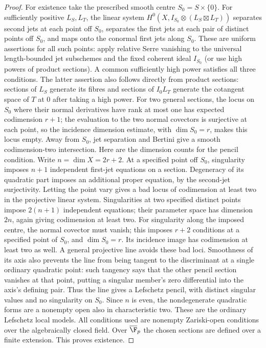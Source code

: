 \documentclass[11pt]{article}
\theoremstyle{remark}\newtheorem{remark}[theorem]{Remark}
\begin{document}
\begin{proof}
For existence take the prescribed smooth centre $S_0=S\times\{0\}$.
For sufficiently positive $L_S,L_T$, the linear system
$H^0(X,I_{S_0}\otimes(L_S\boxtimes L_T))$ separates second jets
at each point off $S_0$, separates the first jets at each pair of
distinct points off $S_0$, and maps onto the conormal first jets
along $S_0$. These are uniform assertions for all such points:
apply relative Serre vanishing to the universal length-bounded
jet subschemes and the fixed coherent ideal $I_{S_0}$ (or use
high powers of product sections). A common sufficiently high
power satisfies all three conditions.
The latter assertion also follows directly from product sections:
sections of $L_S$ generate its fibres and sections of $I_0L_T$
generate the cotangent space of $T$ at $0$ after taking a high power.
For two general sections, the locus on $S_0$ where their normal
derivatives have rank at most one has expected codimension $r+1$;
the evaluation to the two normal covectors is surjective at each
point, so the incidence dimension estimate, with $\dim S_0=r$,
makes this locus empty. Away from $S_0$, jet separation and
Bertini give a smooth codimension-two intersection. Here are the
dimension counts for the pencil condition. Write $n=\dim X=2r+2$.
At a specified point off $S_0$, singularity imposes $n+1$
independent first-jet equations on a section. Degeneracy of its
quadratic part imposes an additional proper equation, by the
second-jet surjectivity. Letting the point vary gives a bad locus
of codimension at least two in the projective linear system.
Singularities at two specified distinct points impose $2(n+1)$
independent equations; their parameter space has dimension $2n$,
again giving codimension at least two. For singularity along the
imposed centre, the normal covector must vanish; this imposes
$r+2$ conditions at a specified point of $S_0$, and $\dim S_0=r$.
Its incidence image has codimension at least two as well. A general
projective line avoids these bad loci. Smoothness of its axis
also prevents the line from being tangent to the discriminant at
a single ordinary quadratic point: such tangency says that the
other pencil section vanishes at that point, putting a singular
member's zero differential into the axis's defining pair.
Thus the line gives a Lefschetz pencil, with distinct singular
values and no singularity on $S_0$. Since $n$ is even, the
nondegenerate quadratic forms are a nonempty open also in
characteristic two. These are the ordinary Lefschetz local models.
All conditions used are nonempty Zariski-open conditions over the
algebraically closed field. Over $\overline{\F}_p$ the chosen
sections are defined over a finite extension. This proves existence.
\end{proof}
\end{document}
